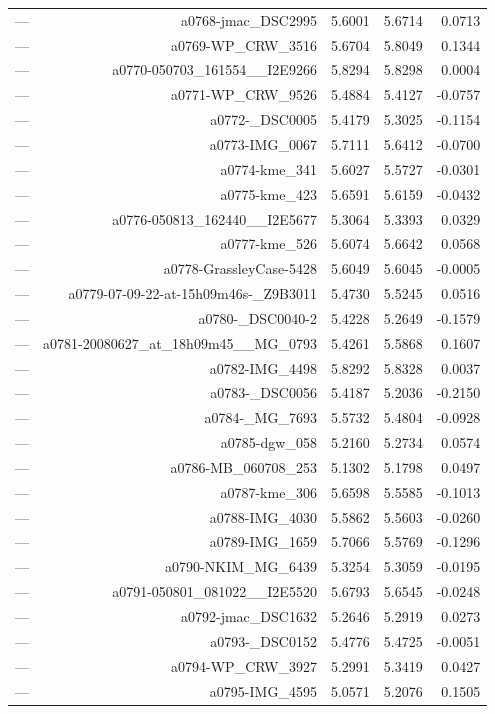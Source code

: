 \begin{table}[htbp]
\begin{tabular}{lrrrr}
— & a0768-jmac_DSC2995 & 5.6001 & 5.6714 & 0.0713 \\
— & a0769-WP_CRW_3516 & 5.6704 & 5.8049 & 0.1344 \\
— & a0770-050703_161554__I2E9266 & 5.8294 & 5.8298 & 0.0004 \\
— & a0771-WP_CRW_9526 & 5.4884 & 5.4127 & -0.0757 \\
— & a0772-_DSC0005 & 5.4179 & 5.3025 & -0.1154 \\
— & a0773-IMG_0067 & 5.7111 & 5.6412 & -0.0700 \\
— & a0774-kme_341 & 5.6027 & 5.5727 & -0.0301 \\
— & a0775-kme_423 & 5.6591 & 5.6159 & -0.0432 \\
— & a0776-050813_162440__I2E5677 & 5.3064 & 5.3393 & 0.0329 \\
— & a0777-kme_526 & 5.6074 & 5.6642 & 0.0568 \\
— & a0778-GrassleyCase-5428 & 5.6049 & 5.6045 & -0.0005 \\
— & a0779-07-09-22-at-15h09m46s-_Z9B3011 & 5.4730 & 5.5245 & 0.0516 \\
— & a0780-_DSC0040-2 & 5.4228 & 5.2649 & -0.1579 \\
— & a0781-20080627_at_18h09m45__MG_0793 & 5.4261 & 5.5868 & 0.1607 \\
— & a0782-IMG_4498 & 5.8292 & 5.8328 & 0.0037 \\
— & a0783-_DSC0056 & 5.4187 & 5.2036 & -0.2150 \\
— & a0784-_MG_7693 & 5.5732 & 5.4804 & -0.0928 \\
— & a0785-dgw_058 & 5.2160 & 5.2734 & 0.0574 \\
— & a0786-MB_060708_253 & 5.1302 & 5.1798 & 0.0497 \\
— & a0787-kme_306 & 5.6598 & 5.5585 & -0.1013 \\
— & a0788-IMG_4030 & 5.5862 & 5.5603 & -0.0260 \\
— & a0789-IMG_1659 & 5.7066 & 5.5769 & -0.1296 \\
— & a0790-NKIM_MG_6439 & 5.3254 & 5.3059 & -0.0195 \\
— & a0791-050801_081022__I2E5520 & 5.6793 & 5.6545 & -0.0248 \\
— & a0792-jmac_DSC1632 & 5.2646 & 5.2919 & 0.0273 \\
— & a0793-_DSC0152 & 5.4776 & 5.4725 & -0.0051 \\
— & a0794-WP_CRW_3927 & 5.2991 & 5.3419 & 0.0427 \\
— & a0795-IMG_4595 & 5.0571 & 5.2076 & 0.1505 \\

\end{tabular}
\end{table}
